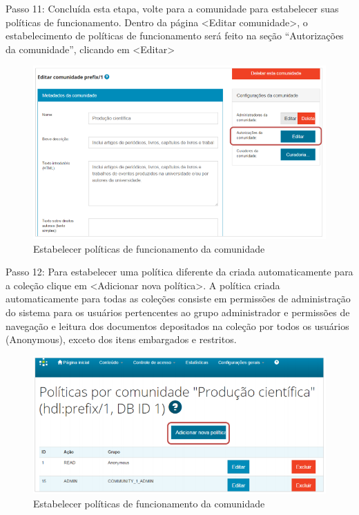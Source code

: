 \documentclass[12pt,hidelinks]{article}
\begin{document}
    Passo 11: Concluída esta etapa, volte para a comunidade para estabelecer suas políticas de funcionamento. Dentro da página <Editar comunidade>, o estabelecimento de políticas de funcionamento será feito na seção “Autorizações da comunidade”, clicando em <Editar>
    
    \begin{figure}[!htp]
                \centering
                \includegraphics[scale=0.7]{figura/Figura28.png}
                \caption{Estabelecer políticas de funcionamento da comunidade}
            \label{Rotulo}
        \end{figure}
        
\newpage
        
    Passo 12: Para estabelecer uma política diferente da criada automaticamente para a coleção clique em <Adicionar nova política>.
    \singlespacing
    A política criada automaticamente para todas as coleções consiste em permissões de administração do sistema para os usuários pertencentes ao grupo administrador e permissões de navegação e leitura dos documentos depositados na coleção por todos os usuários (Anonymous), exceto dos itens embargados e restritos.
    
    \begin{figure}[!htp]
                \centering
                \includegraphics[scale=0.8]{figura/Figura29.png}
                \caption{Estabelecer políticas de funcionamento da comunidade}
            \label{Rotulo}
        \end{figure}
    
\end{document}
